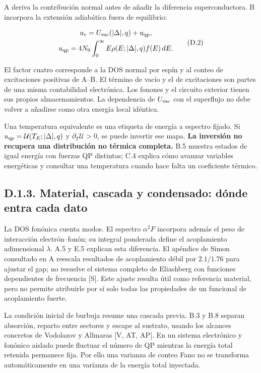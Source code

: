 \documentclass[
  spanish,
  10pt,
  a4paper,
]{article}
\newcounter{none} %
\begin{document}
A deriva la contribución normal antes de añadir la diferencia
superconductora. B incorpora la extensión adiabática fuera de
equilibrio:

\[
\begin{gathered}
u_e=U_{\rm vac}(|\Delta|,q)+u_{\rm qp},\\
u_{\rm qp}=4N_0\int_0^\infty E\rho(E;|\Delta|,q)f(E)\,dE.
\end{gathered}\tag{D.2}
\]

El factor cuatro corresponde a la DOS normal por espín y al conteo de
excitaciones positivas de A--B. El término de vacío y el de excitaciones
son partes de una misma contabilidad electrónica. Los fonones y el
circuito exterior tienen sus propios almacenamientos. La dependencia de
\(U_{\rm vac}\) con el superflujo no debe volver a añadirse como otra
energía local idéntica.

Una temperatura equivalente es una etiqueta de energía a espectro
fijado. Si \(u_{\rm qp}=\mathcal U(T_E;|\Delta|,q)\) y
\(\partial_T\mathcal U>0\), se puede invertir ese mapa. \textbf{La
inversión no recupera una distribución no térmica completa.} B.5 muestra
estados de igual energía con fuerzas QP distintas; C.4 explica cómo
avanzar variables energéticas y consultar una temperatura cuando hace
falta un coeficiente térmico.

\subsection{D.1.3. Material, cascada y condensado: dónde entra cada
dato}\label{d.1.3.-material-cascada-y-condensado-duxf3nde-entra-cada-dato}

La DOS fonónica cuenta modos. El espectro \(\alpha^2F\) incorpora además
el peso de interacción electrón--fonón; su integral ponderada define el
acoplamiento adimensional \(\lambda\). A.5 y E.5 explican esta
diferencia. El apéndice de Simon consultado en A reescala resultados de
acoplamiento débil por \(2.1/1.76\) para ajustar el gap; no resuelve el
sistema completo de Eliashberg con funciones dependientes de frecuencia
{[}S{]}. Este ajuste resulta útil como referencia material, pero no
permite atribuirle por sí solo todas las propiedades de un funcional de
acoplamiento fuerte.

La condición inicial de burbuja resume una cascada previa. B.3 y B.8
separan absorción, reparto entre sectores y escape al sustrato, usando
los alcances concretos de Vodolazov y Allmaras {[}V, AT, AP{]}. En un
sistema electrónico y fonónico aislado puede fluctuar el número de QP
mientras la energía total retenida permanece fija. Por ello una varianza
de conteo Fano no se transforma automáticamente en una varianza de la
energía total inyectada.
\end{document}
